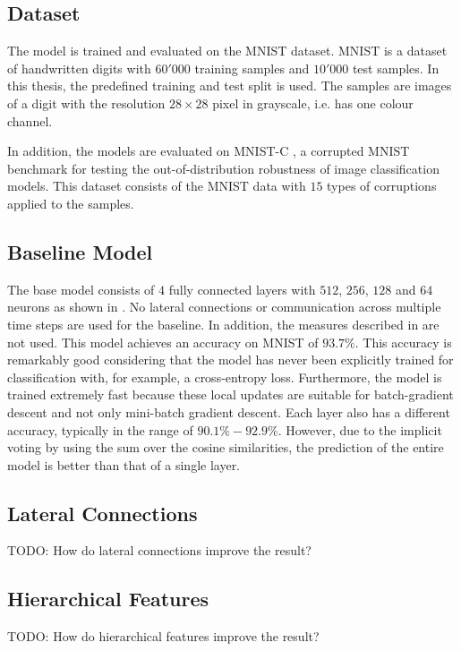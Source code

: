 \subsection{Dataset}
The model is trained and evaluated on the MNIST \cite{Lecun_Bottou_Bengio_Haffner_1998} dataset. MNIST is a dataset of handwritten digits with $60'000$ training samples and $10'000$ test samples.
In this thesis, the predefined training and test split is used.
The samples are images of a digit with the resolution $28 \times 28$ pixel in grayscale, i.e. has one colour channel.

In addition, the models are evaluated on MNIST-C , a corrupted MNIST benchmark for testing the out-of-distribution robustness of image classification models. This dataset consists of the MNIST data with $15$ types of corruptions applied to the samples.

\subsection{Baseline Model}
The base model consists of $4$ fully connected layers with $512$, $256$, $128$ and $64$ neurons as shown in .
No lateral connections or communication across multiple time steps are used for the baseline. In addition, the measures described in  are not used.
This model achieves an accuracy on MNIST of $93.7\%$. This accuracy is remarkably good considering that the model has never been explicitly trained for classification with, for example, a cross-entropy loss.
Furthermore, the model is trained extremely fast because these local updates are suitable for batch-gradient descent and not only mini-batch gradient descent.
Each layer also has a different accuracy, typically in the range of $90.1\% - 92.9\%$. However, due to the implicit voting by using the sum over the cosine similarities, the prediction of the entire model is better than that of a single layer.


\subsection{Lateral Connections}
TODO: How do lateral connections improve the result?


\subsection{Hierarchical Features}
TODO: How do hierarchical features improve the result?










